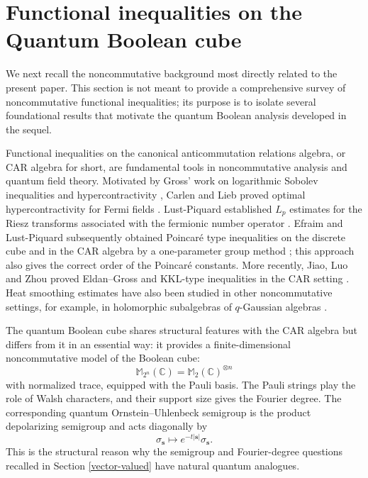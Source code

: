 \documentclass{amsbook}
\theoremstyle{definition}
\theoremstyle{remark}
\numberwithin{section}{chapter}
\numberwithin{equation}{chapter}
\newcommand{\1}{\mathbf{1}}
\begin{document}
\section{Functional inequalities on the Quantum Boolean cube}\label{quantum-boolean-cube}

We next recall the noncommutative background most directly related to the present paper. This section is not meant to provide a comprehensive survey of noncommutative functional inequalities; its purpose is to isolate several foundational results that motivate the quantum Boolean analysis developed in the sequel.

Functional inequalities on the canonical anticommutation relations algebra, or CAR algebra for short, are fundamental tools in noncommutative analysis and quantum field theory.  Motivated by Gross' work on logarithmic Sobolev inequalities and hypercontractivity \cite{Gr1975,Gr1975-Duke}, Carlen and Lieb proved optimal hypercontractivity for Fermi fields \cite[Theorem~4]{CL1993}.  Lust-Piquard established $L_{p}$ estimates for the Riesz transforms associated with the fermionic number operator \cite{Lu1998}.  Efraim and Lust-Piquard subsequently obtained Poincar\'e type inequalities on the discrete cube and in the CAR algebra by a one-parameter group method \cite[Theorem 6.1]{ELP2008}; this approach also gives the correct order of the Poincar\'e constants.  More recently, Jiao, Luo and Zhou proved Eldan--Gross and KKL-type inequalities in the CAR setting \cite{JLZ2025}.  Heat smoothing estimates have also been studied in other noncommutative settings, for example, in holomorphic subalgebras of $q$-Gaussian algebras \cite{Zh2023}.

The quantum Boolean cube shares structural features with the
CAR algebra but differs from it in an
essential way: it  provides a finite-dimensional noncommutative model of the Boolean cube:
\[
\mathbb M_{2^n}(\mathbb C)=\mathbb M_2(\mathbb C)^{\otimes n}
\]
with normalized trace, equipped with the Pauli basis.  The Pauli strings play the role of Walsh characters, and their support size gives the Fourier degree.  The corresponding quantum Ornstein--Uhlenbeck semigroup is the product depolarizing semigroup and acts diagonally by
\[
        \sigma_{\mathbf s}\mapsto e^{-t|\mathbf s|}\sigma_{\mathbf s}.
\]
This is the structural reason why the semigroup and Fourier-degree questions recalled in Section \ref{vector-valued} have natural quantum analogues.
\end{document}
